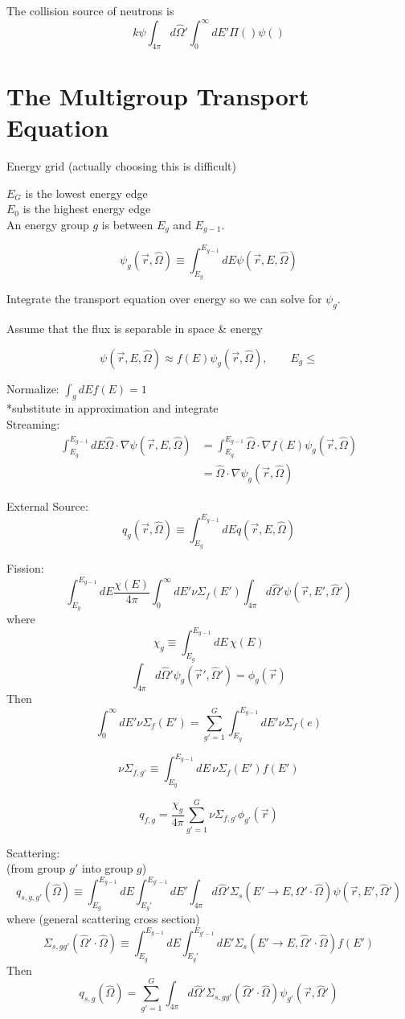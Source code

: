 \documentclass{report}
\newcommand{\h}[1]{\section*{#1}}
\newcommand{\Xs}{\Sigma}
\newcommand{\pos}{\vec{r}}
\newcommand{\Oh}{\hat{\Omega}}
\newcommand{\intfp}{\int_{4\pi}}
\newcommand{\intzi}{\int_0^{\infty}}
\newcommand{\rEO}{(\pos,E,\Oh)}
\newcommand{\rEOprime}{(\pos,E',\Oh')}
\begin{document}
The collision source of neutrons is
$$ k\psi \intfp d\Oh' \intzi dE' \Pi()\psi() $$


\h{The Multigroup Transport Equation}

Energy grid (actually choosing this is difficult)

$E_G$ is the lowest energy edge \\
$E_0$ is the highest energy edge \\

An energy group $g$ is between $E_g$ and $E_{g-1}$.

$$ \psi_g(\pos,\Oh) \equiv \int_{E_g}^{E_{g-1}} dE \psi\rEO $$

Integrate the transport equation over energy so we can solve for $\psi_g$.

Assume that the flux is separable in space \& energy

$$ \psi\rEO \approx f(E)\psi_g (\pos,\Oh), \qquad E_g \leq $$

Normalize: $ \int_g dE f(E) = 1 $\\
*substitute in approximation and integrate\\

Streaming:
\begin{align*}
\int_{E_g}^{E_{g-1}} dE \Oh \cdot \nabla \psi\rEO &= \int_{E_g}^{E_{g-1}} \Oh \cdot \nabla f(E) \psi_g(\pos,\Oh) \\
		&= \Oh \cdot \nabla \psi_g(\pos,\Oh)
\end{align*}

External Source:\\
$$ q_g(\pos,\Oh) \equiv \int_{E_g}^{E_{g-1}} dE q\rEO $$


Fission:\\
$$ \int_{E_g}^{E_{g-1}} dE \frac{\chi(E)}{4\pi} \intzi dE' \nu \Xs_f(E') \intfp d\Oh' \psi\rEOprime $$
where
$$ \chi_g \equiv \int_{E_g}^{E_{g-1}} dE \, \chi(E) $$
$$ \intfp d\Oh' \psi_g(\pos',\Oh') = \phi_g(\pos) $$
Then
$$ \intzi dE' \nu \Xs_f(E') = \sum_{g'=1}^{G} \int_{E_g}^{E_{g-1}} dE' \nu \Xs_f(e) $$

$$\nu\Xs_{f,g'} \equiv \int_{E_g}^{E_{g-1}} dE \, \nu \Xs_f(E')f(E') $$

$$ q_{f,g} = \frac{\chi_g}{4\pi} \sum_{g'=1}^{G} \nu\Xs_{f,g'} \phi_{g'}(\pos) $$


Scattering: \\
(from group $g'$ into group $g$)
$$ q_{s,g,g'}(\Oh) \equiv \int_{E_g}^{E_{g-1}} dE \int_{E_g'}^{E_{g'-1}} dE' \intfp d\Oh' \Xs_s(E' \rightarrow E, \Oh' \cdot \Oh)\psi\rEOprime $$
where (general scattering cross section)
$$ \Xs_{s,gg'}(\Oh' \cdot \Oh) \equiv \int_{E_g}^{E_{g-1}} dE \int_{E_g'}^{E_{g'-1}} dE' \Xs_s(E' \rightarrow E, \Oh' \cdot \Oh) f(E') $$
Then
$$ q_{s,g}(\Oh) = \sum_{g'=1}^G \intfp d\Oh' \Xs_{s,gg'}(\Oh' \cdot \Oh) \psi_{g'}(\pos,\Oh') $$
\end{document}
